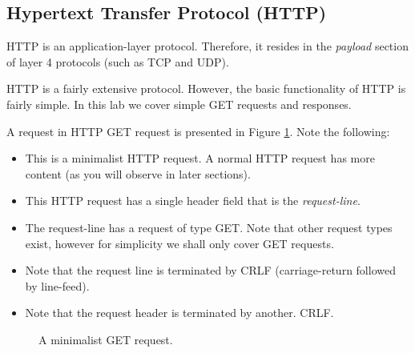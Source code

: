 \documentclass[pdftex,12pt,a4paper]{article}
\begin{document}
        \subsection{Hypertext Transfer Protocol (HTTP)}
            HTTP is an application-layer protocol. Therefore, it resides in the
            \emph{payload} section of layer 4 protocols (such as TCP and UDP).

            HTTP is a fairly extensive protocol. However, the basic
            functionality of HTTP is fairly simple. In this lab we cover simple
            GET requests and responses.

            A request in HTTP GET request is presented in Figure
            \ref{fig:getreq}. Note the following:
            \begin{itemize}
                \item This is a minimalist HTTP request. A normal HTTP request
                has more content (as you will observe in later sections).
                \item This HTTP request has a single header field that is the
                \emph{request-line}.
                \item The request-line has a request of type GET. Note that
                    other request types exist, however for simplicity we shall
                    only cover GET requests.
                \item Note that the request line is terminated by CRLF
                    (carriage-return followed by line-feed).
                \item Note that the request header is terminated by another.
                    CRLF.
            \end{itemize}
            \begin{figure}[tbh]
                \centering
                
                \caption{A minimalist GET request.}
                \label{fig:getreq}
            \end{figure}
\end{document}
